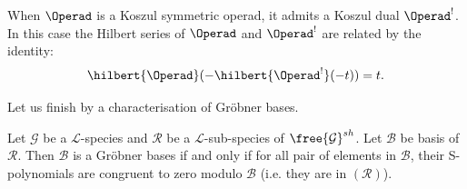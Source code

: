 When $\Operad$ is a Koszul symmetric operad, it admits a Koszul dual $\Operad^!$. In this case the Hilbert series of $\Operad$ and $\Operad^!$ are related by
the identity:
\begin{equation} \label{hdual}
    \hilbert{\Operad}(-\hilbert{\Operad^!}(-t)) = t.
\end{equation}

Let us finish by a characterisation of Gröbner bases.

\begin{prop}[{\cite[Theorem 1]{DK10}}]\label{prop_spol}
    Let $\mathcal{G}$ be a $\mathscr{L}$-species and $\mathcal{R}$ be a $\mathscr{L}$-sub-species of $\free{\mathcal{G}}^{sh}$. Let $\mathcal{B}$ 
    be basis of $\mathcal{R}$. Then $\mathcal{B}$ is a Gröbner bases if and only if for all pair of elements in $\mathcal{B}$, their S-polynomials
    are congruent to zero modulo $\mathcal{B}$ (i.e. they are in $(\mathcal{R})$).
\end{prop}

